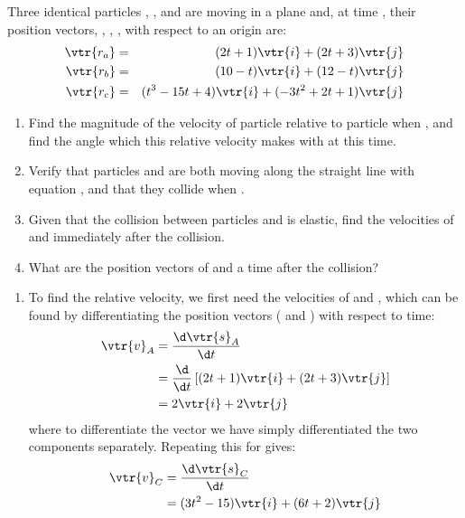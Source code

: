 
\begin{problem}[A1988FMIVQ1a] %
{Three identical particles , , and  are moving in a plane and, at time , their position vectors, , , , with respect to an origin  are:
\begin{eqnarray*} 
\vtr{r_a} &=& (2t +1)\vtr{i} + (2t+ 3)\vtr{j}  \\ 
\vtr{r_b} &=& (10 - t)\vtr{i} + (12 - t)\vtr{j} \\ 
\vtr{r_c} &=& (t^{3} - 15t + 4)\vtr{i} + (-3t^{2} + 2t + 1)\vtr{j} 
\end{eqnarray*} 

\begin{enumerate}
	\item Find the magnitude of the velocity of particle  relative to particle  when , and find the angle which this relative velocity makes with  at this time.
	\item Verify that particles  and  are both moving along the straight line with equation , and that they collide when .
	\item Given that the collision between particles  and  is elastic, find the velocities of  and  immediately after the collision.
	\item What are the position vectors of  and  a time \vari{\tau} after the collision?
\end{enumerate}
}
{}
{
\begin{enumerate}
	\item To find the relative velocity, we first need the velocities of  and , which can be found by differentiating the position vectors ( and ) with respect to time:
\begin{eqnarray*} 
\vtr{v}_{A} &= \frac{\d \vtr{s}_{A}}{\d t} \\ 
&= \frac{\d}{\d t}\left[(2t + 1)\vtr{i} + (2t + 3)\vtr{j}\right] \\ 
&= 2\vtr{i} + 2\vtr{j} 
\end{eqnarray*}
where to differentiate the vector we have simply differentiated the two components separately. Repeating this for   gives:
\begin{eqnarray*} 
\vtr{v}_{C} & = \frac{\d \vtr{s}_{C}}{\d t} \\ 
&= (3t^{2} - 15)\vtr{i} + (6t + 2)\vtr{j} 
\end{eqnarray*}


\end{enumerate}}
\end{problem}
